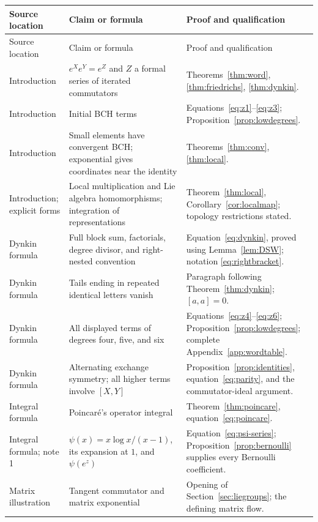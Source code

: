 \documentclass[11pt]{article}
\theoremstyle{definition}
\theoremstyle{remark}
\numberwithin{equation}{section}
\begin{document}
\begingroup\small
\setlength{\tabcolsep}{4pt}
\renewcommand{\arraystretch}{1.18}
\begin{longtable}{@{}>{\raggedright\arraybackslash}p{}>{\raggedright\arraybackslash}p{}>{\raggedright\arraybackslash}p{}@{}}
\toprule
Source location&Claim or formula&Proof and qualification\\
\midrule\endfirsthead
\toprule
Source location&Claim or formula&Proof and qualification\\
\midrule\endhead
\bottomrule\endfoot
Introduction&$e^Xe^Y=e^Z$ and $Z$ a formal series of iterated commutators&Theorems~\ref{thm:word}, \ref{thm:friedrichs}, \ref{thm:dynkin}.\\
Introduction&Initial BCH terms&Equations~\eqref{eq:z1}--\eqref{eq:z3}; Proposition~\ref{prop:lowdegrees}.\\
Introduction&Small elements have convergent BCH; exponential gives coordinates near the identity&Theorems~\ref{thm:conv}, \ref{thm:local}.\\
Introduction; explicit forms&Local multiplication and Lie algebra homomorphisms; integration of representations&Theorem~\ref{thm:local}, Corollary~\ref{cor:localmap}; topology restrictions stated.\\
Dynkin formula&Full block sum, factorials, degree divisor, and right-nested convention&Equation~\eqref{eq:dynkin}, proved using Lemma~\ref{lem:DSW}; notation \eqref{eq:rightbracket}.\\
Dynkin formula&Tails ending in repeated identical letters vanish&Paragraph following Theorem~\ref{thm:dynkin}; $[a,a]=0$.\\
Dynkin formula&All displayed terms of degrees four, five, and six&Equations~\eqref{eq:z4}--\eqref{eq:z6}; Proposition~\ref{prop:lowdegrees}; complete Appendix~\ref{app:wordtable}.\\
Dynkin formula&Alternating exchange symmetry; all higher terms involve $[X,Y]$&Proposition~\ref{prop:identities}, equation~\eqref{eq:parity}, and the commutator-ideal argument.\\
Integral formula&Poincar\'e's operator integral&Theorem~\ref{thm:poincare}, equation~\eqref{eq:poincare}.\\
Integral formula; note 1&$\psi(x)=x\log x/(x-1)$, its expansion at $1$, and $\psi(e^z)$&Equation~\eqref{eq:psi-series}; Proposition~\ref{prop:bernoulli} supplies every Bernoulli coefficient.\\
Matrix illustration&Tangent commutator and matrix exponential&Opening of Section~\ref{sec:liegroups}; the defining matrix flow.\\

\end{longtable}
\end{document}
